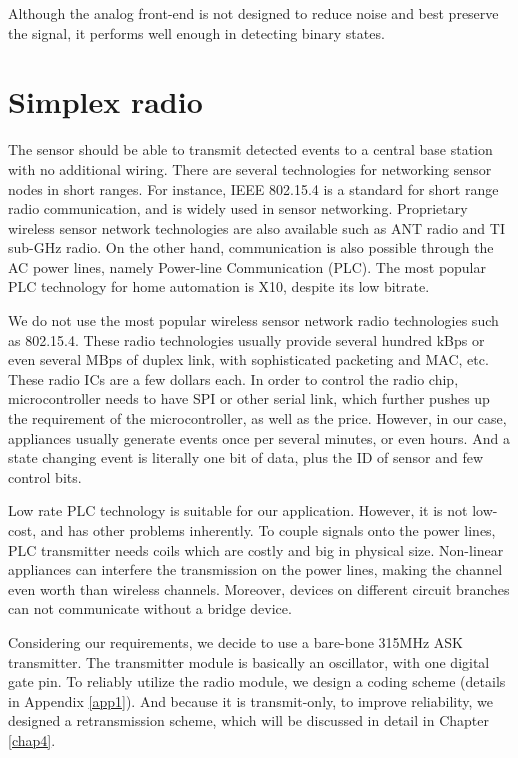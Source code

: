 Although the analog front-end is not designed to reduce noise and best preserve the signal, it performs well enough in detecting binary states. 

\section{Simplex radio}

The sensor should be able to transmit detected events to a central base station with no additional wiring. There are several technologies for networking sensor nodes in short ranges. For instance, IEEE 802.15.4 is a standard for short range radio communication, and is widely used in sensor networking. Proprietary wireless sensor network technologies are also available such as ANT radio and TI sub-GHz radio. On the other hand, communication is also possible through the AC power lines, namely Power-line Communication (PLC). The most popular PLC technology for home automation is X10, despite its low bitrate. 

We do not use the most popular wireless sensor network radio technologies such as 802.15.4. These radio technologies usually provide several hundred kBps or even several MBps of duplex link, with sophisticated packeting and MAC, etc. These radio ICs are a few dollars each. In order to control the radio chip, microcontroller needs to have SPI or other serial link, which further pushes up the requirement of the microcontroller, as well as the price. However, in our case, appliances usually generate events once per several minutes, or even hours. And a state changing event is literally one bit of data, plus the ID of sensor and few control bits. 

Low rate PLC technology is suitable for our application. However, it is not low-cost, and has other problems inherently. To couple signals onto the power lines, PLC transmitter needs coils which are costly and big in physical size. Non-linear appliances can interfere the transmission on the power lines, making the channel even worth than wireless channels. Moreover, devices on different circuit branches can not communicate without a bridge device. 

Considering our requirements, we decide to use a bare-bone 315MHz ASK transmitter. The transmitter module is basically an oscillator, with one digital gate pin. To reliably utilize the radio module, we design a coding scheme (details in Appendix \ref{app1}). And because it is transmit-only, to improve reliability, we designed a retransmission scheme, which will be discussed in detail in Chapter \ref{chap4}. 

